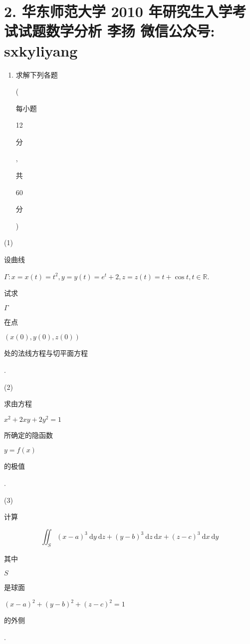 \documentclass[10pt]{article}
\begin{document}
\section{2. 华东师范大学 2010 年研究生入学考试试题数学分析 
 李扬 
 微信公众号: sxkyliyang}
\begin{enumerate}
  \item \begin{CJK}{UTF8}{mj}求解下列各题\end{CJK} (\begin{CJK}{UTF8}{mj}每小题\end{CJK} 12 \begin{CJK}{UTF8}{mj}分\end{CJK}, \begin{CJK}{UTF8}{mj}共\end{CJK} 60 \begin{CJK}{UTF8}{mj}分\end{CJK})
\end{enumerate}
(1) \begin{CJK}{UTF8}{mj}设曲线\end{CJK} $\Gamma: x=x(t)=t^{2}, y=y(t)=e^{t}+2, z=z(t)=t+\cos t, t \in \mathbb{R}$. \begin{CJK}{UTF8}{mj}试求\end{CJK} $\Gamma$ \begin{CJK}{UTF8}{mj}在点\end{CJK} $(x(0), y(0), z(0))$ \begin{CJK}{UTF8}{mj}处的法线方程与切平面方程\end{CJK}.

(2) \begin{CJK}{UTF8}{mj}求由方程\end{CJK} $x^{2}+2 x y+2 y^{2}=1$ \begin{CJK}{UTF8}{mj}所确定的隐函数\end{CJK} $y=f(x)$ \begin{CJK}{UTF8}{mj}的极值\end{CJK}.

(3) \begin{CJK}{UTF8}{mj}计算\end{CJK}
$$
\iint_{S}(x-a)^{3} \mathrm{~d} y \mathrm{~d} z+(y-b)^{3} \mathrm{~d} z \mathrm{~d} x+(z-c)^{3} \mathrm{~d} x \mathrm{~d} y
$$
\begin{CJK}{UTF8}{mj}其中\end{CJK} $S$ \begin{CJK}{UTF8}{mj}是球面\end{CJK} $(x-a)^{2}+(y-b)^{2}+(z-c)^{2}=1$ \begin{CJK}{UTF8}{mj}的外侧\end{CJK}.
\end{document}
